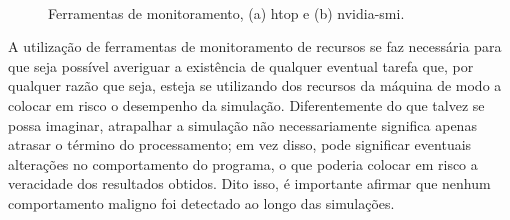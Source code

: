 \begin{figure}[H]
    \centering
    \\
    \vspace{0.5cm}
    \caption{Ferramentas de monitoramento, (a) htop e (b) nvidia-smi.}
    \label{fig:results_resources_monitoring_tools}
\end{figure}

A utilização de ferramentas de monitoramento de recursos se faz necessária para que seja possível averiguar a existência de qualquer eventual tarefa que, por qualquer razão que seja, esteja se utilizando dos recursos da máquina de modo a colocar em risco o desempenho da simulação. Diferentemente do que talvez se possa imaginar, atrapalhar a simulação não necessariamente significa apenas atrasar o término do processamento; em vez disso, pode significar eventuais alterações no comportamento do programa, o que poderia colocar em risco a veracidade dos resultados obtidos. Dito isso, é importante afirmar que nenhum comportamento maligno foi detectado ao longo das simulações.



